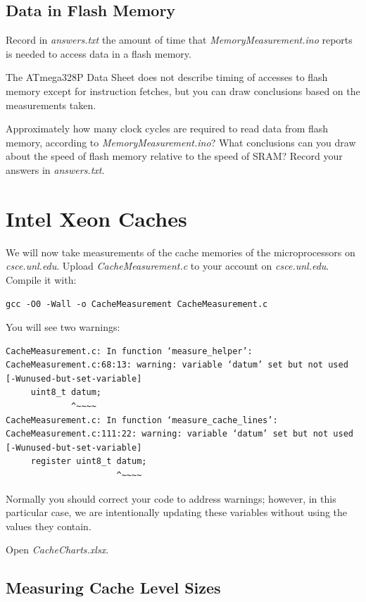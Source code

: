 \subsection{Data in Flash Memory}

Record in \textit{answers.txt} the amount of time that
\textit{MemoryMeasurement.ino} reports is needed to access data in a flash
memory.

The ATmega328P Data Sheet does not describe timing of accesses to flash memory
except for instruction fetches, but you can draw conclusions based on the
measurements taken.

Approximately how many clock cycles are required to read data from flash
memory, according to \textit{MemoryMeasurement.ino}? What conclusions can you
draw about the speed of flash memory relative to the speed of SRAM? Record your
answers in \textit{answers.txt}.

\section{Intel Xeon Caches}

We will now take measurements of the cache memories of the microprocessors on
\textit{csce.unl.edu}. Upload \textit{CacheMeasurement.c} to your account on
\textit{csce.unl.edu}. Compile it with:

\texttt{gcc -O0 -Wall -o CacheMeasurement CacheMeasurement.c}

You will see two warnings:
\begin{verbatim}
CacheMeasurement.c: In function ‘measure_helper’:
CacheMeasurement.c:68:13: warning: variable ‘datum’ set but not used [-Wunused-but-set-variable]
     uint8_t datum;
             ^~~~~
CacheMeasurement.c: In function ‘measure_cache_lines’:
CacheMeasurement.c:111:22: warning: variable ‘datum’ set but not used [-Wunused-but-set-variable]
     register uint8_t datum;
                      ^~~~~
\end{verbatim}

Normally you should correct your code to address warnings; however, in this
particular case, we are intentionally updating these variables without using
the values they contain.

Open \textit{CacheCharts.xlsx}.

\subsection{Measuring Cache Level Sizes}


